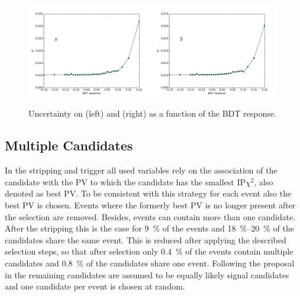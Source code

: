\begin{figure}[tbp]
    \centering
    \includegraphics[width=0.49\textwidth]{06selection/figs/sensitiv_Sf.pdf}
    \includegraphics[width=0.49\textwidth]{06selection/figs/sensitiv_Sfbar.pdf}
    \caption{Uncertainty on \Sf (left) and \Sfbar (right) as a function of the \ac{BDT} response.}
    \label{fig:BDTopt}
\end{figure}

\subsection{Multiple Candidates}
\label{sec:MultCands}

In the stripping and trigger all used variables rely on the association of the \Bz candidate with the \ac{PV} to which the candidate has the smallest $\text{IP}\chi^2$, also denoted as best \ac{PV}.
To be consistent with this strategy for each event also the best \ac{PV} is chosen.
Events where the formerly best \ac{PV} is no longer present after the selection are removed.
Besides, events can contain more than one \Bz candidate.
After the stripping this is the case for \SI{9}{\percent} of the events and \SIrange{18}{20}{\percent} of the \Bz candidates share the same event.
This is reduced after applying the described selection steps, so that after selection only \SI{0.4}{\percent} of the events contain multiple candidates and \SI{0.8}{\percent} of the \Bz candidates share one event.
Following the proposal in \cite{Koppenburg:2017zsh} the remaining candidates are assumed to be equally likely signal candidates and one candidate per event is chosen at random.

